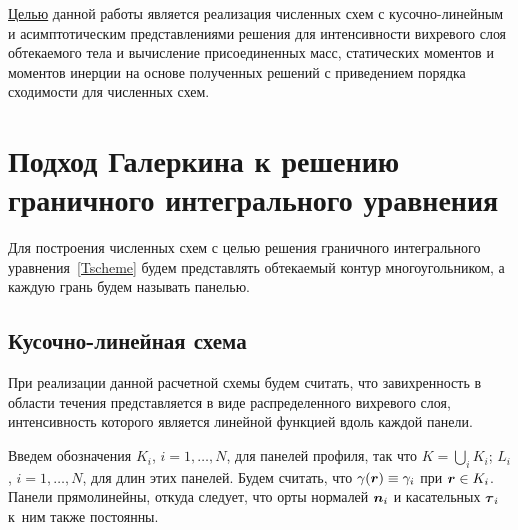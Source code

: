 \documentclass[12pt, a4paper]{article}
\renewcommand{\vec}[1]{\text{\mathversion{bold}${#1}$}}%
\begin{document}
\underline{Целью} данной работы является %
реализация численных схем с кусочно-линейным и асимптотическим представлениями решения для интенсивности вихревого слоя обтекаемого тела и вычисление присоединенных масс, статических моментов и моментов инерции на основе полученных решений с приведением порядка сходимости для численных схем.

\section{Подход Галеркина к решению граничного интегрального уравнения}

Для построения численных схем с целью решения граничного интегрального уравнения~\eqref{Tscheme} будем представлять обтекаемый контур многоугольником, а каждую грань будем называть панелью.

\subsection{Кусочно-линейная схема}

При реализации данной расчетной схемы будем считать, что завихренность в области течения представляется в виде распределенного вихревого слоя, интенсивность которого является линейной функцией вдоль каждой панели.

Введем обозначения $K_i$, $i=1,\ldots,N$, для панелей профиля, так что $K=\bigcup_{i} K_i$; $L_i$, $i=1,\ldots,N$, для длин этих панелей. Будем считать, что $\gamma(\vec r)\equiv\gamma_i$ при $\vec r\in K_i$. Панели прямолинейны, откуда следует, что орты нормалей $\vec n_i$ и касательных $\vec \tau_i$ к~ним также постоянны.
\end{document}
